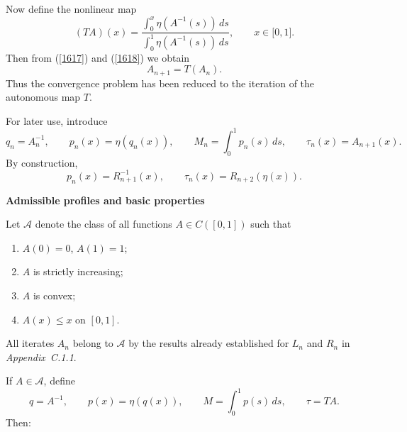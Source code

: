 \documentclass[onecolumn]{article}
\begin{document}
Now define the nonlinear map 
\begin{equation}
(TA)(x)=\frac{\int_{0}^{x}\eta (A^{-1}(s))\,ds}{\int_{0}^{1}\eta
(A^{-1}(s))\,ds},\qquad x\in \lbrack 0,1].  \label{1619}
\end{equation}%
Then from (\ref{1617}) and (\ref{1618}) we obtain 
\begin{equation}
A_{n+1}=T(A_{n}).  \label{1620}
\end{equation}%
Thus the convergence problem has been reduced to the iteration of the
autonomous map $T$.

For later use, introduce 
\begin{equation}
q_{n}=A_{n}^{-1},\qquad p_{n}(x)=\eta (q_{n}(x)),\qquad
M_{n}=\int_{0}^{1}p_{n}(s)\,ds,\qquad \tau _{n}(x)=A_{n+1}(x).  \label{1621}
\end{equation}%
By construction, 
\begin{equation}
p_{n}(x)=R_{n+1}^{-1}(x),\qquad \tau _{n}(x)=R_{n+2}(\eta (x)).  \label{1622}
\end{equation}

\begin{flushleft}
\textbf{Admissible profiles and basic properties}
\end{flushleft}

Let $\mathcal{A}$ denote the class of all functions $A\in C([0,1])$ such that

\begin{enumerate}
\item $A(0)=0$, $A(1)=1$;

\item $A$ is strictly increasing;

\item $A$ is convex;

\item $A(x)\le x$ on $[0,1]$.
\end{enumerate}

All iterates $A_{n}$ belong to $\mathcal{A}$ by the results already
established for $L_{n}$ and $R_{n}$ in \textit{Appendix~C.1.1}.

If $A\in \mathcal{A}$, define 
\begin{equation}
q=A^{-1},\qquad p(x)=\eta (q(x)),\qquad M=\int_{0}^{1}p(s)\,ds,\qquad \tau
=TA.  \label{1623}
\end{equation}%
Then:
\end{document}
